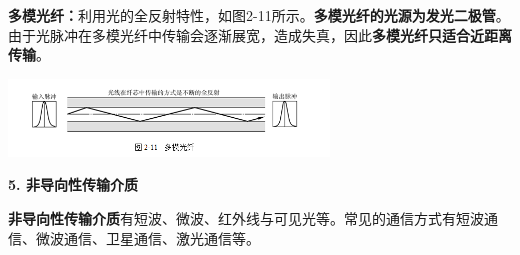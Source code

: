 \textbf{多模光纤：}利用光的全反射特性，如图2-11所示。\textbf{多模光纤的光源为发光二极管}。由于光脉冲在多模光纤中传输会逐渐展宽，造成失真，因此\textbf{多模光纤只适合近距离传输}。

\includegraphics[width=3.35417in,height=0.81250in]{png-jpeg-pics/B3144BFA68F44A13A555A048CD9CFCBB.png}

\textbf{\textbf{{5. 非导向性传输介质}}\\
}

\textbf{非导向性传输介质}有短波、微波、红外线与可见光等。常见的通信方式有短波通信、微波通信、卫星通信、激光通信等。
